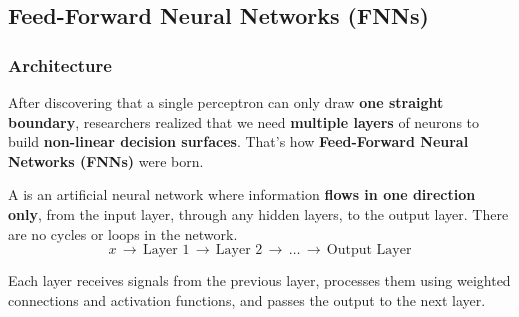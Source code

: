 \subsection{Feed-Forward Neural Networks (FNNs)}

\subsubsection{Architecture}

After discovering that a single perceptron can only draw \textbf{one straight boundary}, researchers realized that we need \textbf{multiple layers} of neurons to build \textbf{non-linear decision surfaces}. That's how \textbf{Feed-Forward Neural Networks (FNNs)} were born.

\highspace
\begin{definitionbox}
    A  is an artificial neural network where information \textbf{flows in one direction only}, from the input layer, through any hidden layers, to the output layer. There are no cycles or loops in the network.
    \begin{equation*}
        x \, \rightarrow \, \text{Layer 1} \, \rightarrow \, \text{Layer 2} \, \rightarrow \, \dots \, \rightarrow \, \text{Output Layer}
    \end{equation*}

    \highspace
    Each layer receives signals from the previous layer, processes them using weighted connections and activation functions, and passes the output to the next layer.
\end{definitionbox}

